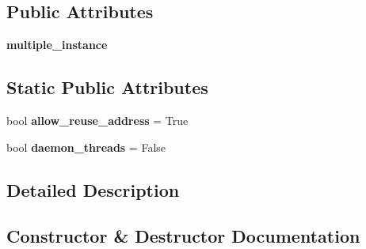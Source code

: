 \subsection*{Public Attributes}
\begin{DoxyCompactItemize}
\item 
{\bfseries multiple\+\_\+instance}\hypertarget{classremi_1_1server_1_1ThreadedWebsocketServer_a2b2491ae630592311427c7cf3073f365}{}\label{classremi_1_1server_1_1ThreadedWebsocketServer_a2b2491ae630592311427c7cf3073f365}

\end{DoxyCompactItemize}
\subsection*{Static Public Attributes}
\begin{DoxyCompactItemize}
\item 
bool {\bfseries allow\+\_\+reuse\+\_\+address} = True\hypertarget{classremi_1_1server_1_1ThreadedWebsocketServer_a9efb250369532ee7aae538e1fc17d412}{}\label{classremi_1_1server_1_1ThreadedWebsocketServer_a9efb250369532ee7aae538e1fc17d412}

\item 
bool {\bfseries daemon\+\_\+threads} = False\hypertarget{classremi_1_1server_1_1ThreadedWebsocketServer_af189863be6a7530cdd3168aa4b094e24}{}\label{classremi_1_1server_1_1ThreadedWebsocketServer_af189863be6a7530cdd3168aa4b094e24}

\end{DoxyCompactItemize}


\subsection{Detailed Description}
\begin{DoxyVerb}\end{DoxyVerb}
 

\subsection{Constructor \& Destructor Documentation}
